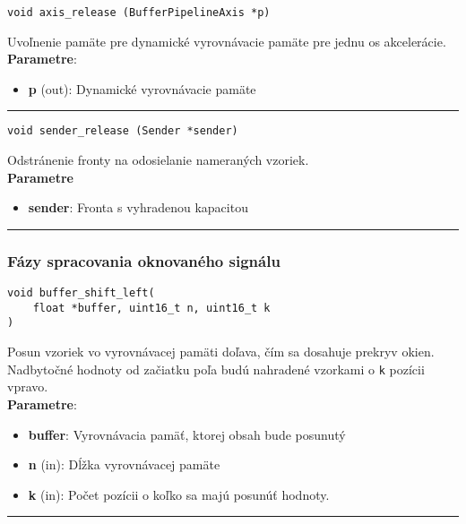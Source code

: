 \begin{lstlisting}[style=docs]
void axis_release (BufferPipelineAxis *p)
\end{lstlisting}
   Uvoľnenie pamäte pre dynamické vyrovnávacie pamäte pre jednu os akcelerácie. \\ 
\textbf{Parametre}:
\begin{itemize}[noitemsep, topsep=0pt]
	\item \textbf{p} (out): Dynamické vyrovnávacie pamäte
\end{itemize}
\bigbreak
\hrule

\begin{lstlisting}[style=docs]
void sender_release (Sender *sender)
\end{lstlisting}
   Odstránenie fronty na odosielanie nameraných vzoriek. \\ 
\textbf{Parametre}
\begin{itemize}[noitemsep, topsep=0pt]
	\item \textbf{sender}: Fronta s vyhradenou kapacitou
\end{itemize}
\bigbreak
\hrule


\subsubsection*{Fázy spracovania oknovaného signálu}
\begin{lstlisting}[style=docs]
void buffer_shift_left(
	float *buffer, uint16_t n, uint16_t k
)
\end{lstlisting}
Posun vzoriek vo vyrovnávacej pamäti doľava, čím sa dosahuje prekryv okien. 
Nadbytočné hodnoty od začiatku poľa budú nahradené vzorkami o \verb|k| pozícii vpravo. \\ 
\textbf{Parametre}:
\begin{itemize}[noitemsep, topsep=0pt]
	\item \textbf{buffer}: Vyrovnávacia pamäť, ktorej obsah bude posunutý
 	\item \textbf{n} (in): Dĺžka vyrovnávacej pamäte
	\item \textbf{k} (in): Počet pozícii o koľko sa majú posunúť hodnoty.
\end{itemize}
\bigbreak
\hrule

